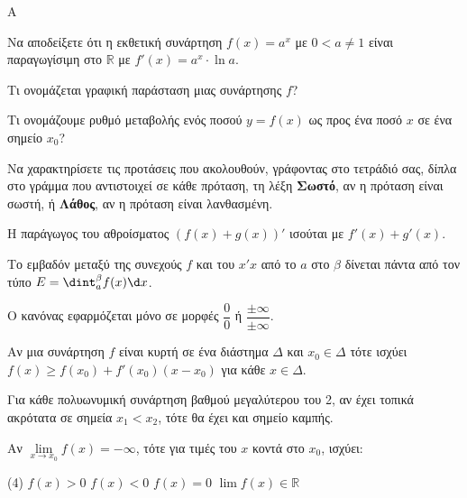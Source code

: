 \begin{thema}{A}
\begin{erwthma}
    \item Να αποδείξετε ότι η εκθετική συνάρτηση $ f(x)=a^x $ με $ 0<a\neq 1 $ είναι παραγωγίσιμη στο $ \mathbb{R} $ με $ f'(x)=a^x\cdot\ln{a} $.
    \item Τι ονομάζεται γραφική παράσταση μιας συνάρτησης $f$?
    \item Τι ονομάζουμε ρυθμό μεταβολής ενός ποσού $y=f(x)$ ως προς ένα ποσό $x$ σε ένα σημείο $x_0$?
    \item Να χαρακτηρίσετε τις προτάσεις που ακολουθούν, γράφοντας στο τετράδιό σας, δίπλα στο γράμμα που αντιστοιχεί σε κάθε πρόταση, τη λέξη \textbf{Σωστό}, αν η πρόταση είναι σωστή, ή \textbf{Λάθος}, αν η πρόταση είναι λανθασμένη.
    \begin{alist}
        \item Η παράγωγος του αθροίσματος $(f(x)+g(x))'$ ισούται με $f'(x)+g'(x)$.
        \item Το εμβαδόν μεταξύ της συνεχούς $f$ και του $x'x$ από το $a$ στο $\beta$ δίνεται πάντα από τον τύπο $E = \dint_a^\beta f(x) \d x$.
        \item Ο κανόνας  εφαρμόζεται μόνο σε μορφές $\dfrac{0}{0}$ ή $\dfrac{\pm \infty}{\pm \infty}$.
        \item Αν μια συνάρτηση $f$ είναι κυρτή σε ένα διάστημα $\varDelta$ και $x_0\in\varDelta$ τότε ισχύει $f(x) \ge f(x_0) + f'(x_0)(x-x_0)$ για κάθε $x\in\varDelta$.
        \item Για κάθε πολυωνυμική συνάρτηση βαθμού μεγαλύτερου του 2, αν έχει τοπικά ακρότατα σε σημεία $x_1<x_2$, τότε θα έχει και σημείο καμπής.
    \end{alist}
    \item Αν $\lim\limits_{x\to x_0} f(x) = -\infty$, τότε για τιμές του $x$ κοντά στο $x_0$, ισχύει:
    \begin{tasks}[label=\let\textdexiakeraia\relax\alph*.](4)
        \task $f(x) > 0$
        \task $f(x) < 0$
        \task $f(x) = 0$
        \task $\lim\limits f(x) \in \mathbb{R}$
    \end{tasks}
\end{erwthma}
\end{thema}


